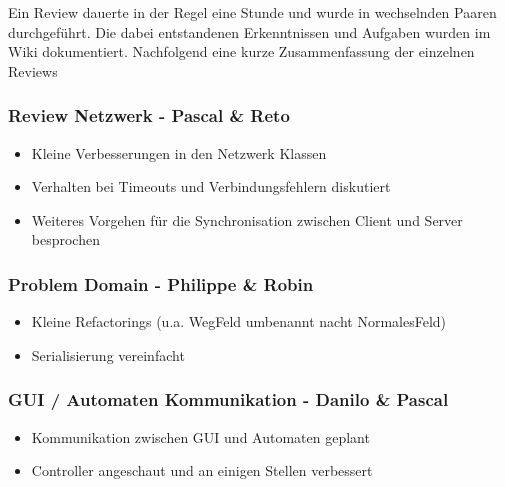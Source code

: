 \documentclass[12pt,halfparskip]{scrartcl}
\begin{document}
Ein Review dauerte in der Regel eine Stunde und wurde in wechselnden Paaren durchgeführt. Die dabei entstandenen Erkenntnissen und Aufgaben wurden im Wiki dokumentiert. Nachfolgend eine kurze Zusammenfassung der einzelnen Reviews

\subsubsection{Review Netzwerk - Pascal \& Reto}
\label{ssub:review_netzwerk_pascal_amp_reto}

\begin{itemize}
	\item Kleine Verbesserungen in den Netzwerk Klassen
	\item Verhalten bei Timeouts und Verbindungsfehlern diskutiert
	\item Weiteres Vorgehen für die Synchronisation zwischen Client und Server besprochen
\end{itemize}


\subsubsection{Problem Domain - Philippe \& Robin}
\label{ssub:problem_domain_philippe_amp_robin}

\begin{itemize}
	\item Kleine Refactorings (u.a. WegFeld umbenannt nacht NormalesFeld)
	\item Serialisierung vereinfacht
\end{itemize}


\subsubsection{GUI / Automaten Kommunikation - Danilo \& Pascal}
\label{ssub:gui_automaten_kommunikation_danilo_amp_pascal}

\begin{itemize}
	\item Kommunikation zwischen GUI und Automaten geplant
	\item Controller angeschaut und an einigen Stellen verbessert
\end{itemize}
\end{document}
